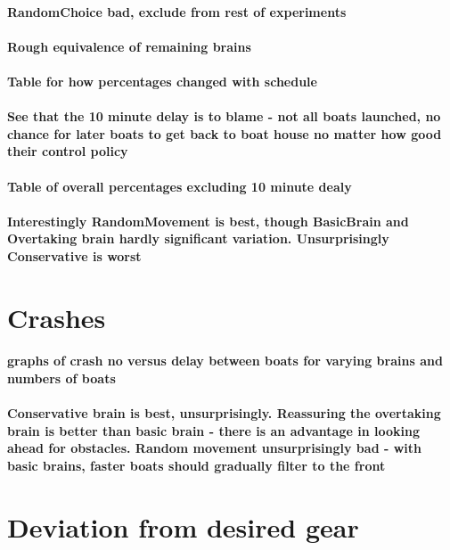   \paragraph{RandomChoice bad, exclude from rest of experiments}
  
  \paragraph{Rough equivalence of remaining brains}
  
  \paragraph{Table for how percentages changed with schedule}
  
  \paragraph{See that the 10 minute delay is to blame - not all boats launched, no chance for later boats to get back to boat house no matter how good their control policy}
  
  \paragraph{Table of overall percentages excluding 10 minute dealy}
  
  \paragraph{Interestingly RandomMovement is best, though BasicBrain and Overtaking brain hardly significant variation. Unsurprisingly Conservative is worst}
  
\section{Crashes}
  \paragraph{graphs of crash no versus delay between boats for varying brains and numbers of boats}
  
  \paragraph{Conservative brain is best, unsurprisingly. Reassuring the overtaking brain is better than basic brain - there is an advantage in looking ahead for obstacles. Random movement unsurprisingly bad - with basic brains, faster boats should gradually filter to the front}
  
\section{Deviation from desired gear}